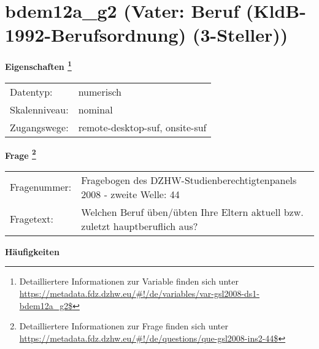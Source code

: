 
    \setcounter{footnote}{0}

    \vspace*{-1.8cm}
	\section{bdem12a\_g2 (Vater: Beruf (KldB-1992-Berufsordnung) (3-Steller))}
	\label{section:bdem12a_g2}



    \vspace*{0.5cm}
    \noindent\textbf{Eigenschaften
	\footnote{Detailliertere Informationen zur Variable finden sich unter
		\url{https://metadata.fdz.dzhw.eu/\#!/de/variables/var-gsl2008-ds1-bdem12a_g2$}}}\\
	\begin{tabularx}{\hsize}{@{}lX}
	Datentyp: & numerisch \\
	Skalenniveau: & nominal \\
	Zugangswege: &
	  remote-desktop-suf, 
	  onsite-suf
 \\
    \end{tabularx}



				\vspace*{0.5cm}
                \noindent\textbf{Frage
	                \footnote{Detailliertere Informationen zur Frage finden sich unter
		              \url{https://metadata.fdz.dzhw.eu/\#!/de/questions/que-gsl2008-ins2-44$}}}\\
				\begin{tabularx}{\hsize}{@{}lX}
					Fragenummer: &
					  Fragebogen des DZHW-Studienberechtigtenpanels 2008 - zweite Welle:
					  44
 \\
					Fragetext: & Welchen Beruf üben/übten Ihre Eltern aktuell bzw. zuletzt hauptberuflich aus? \\
				\end{tabularx}





        		\vspace*{0.5cm}
                \noindent\textbf{Häufigkeiten}


